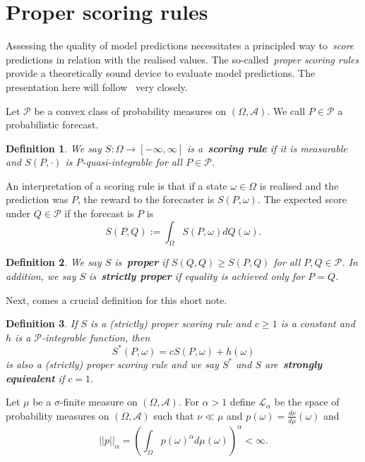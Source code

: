 \documentclass[a4paper, notitlepage, 11pt]{article}
\newtheorem{definition}{Definition}[]
\begin{document}
\section{Proper scoring rules}

Assessing the quality of model predictions necessitates a principled way to~\textit{score}  predictions in relation with the realised values.
The so-called~\textit{proper scoring rules} provide a theoretically sound device to evaluate model predictions.
The presentation here will follow~\cite{Gneiting2007} very closely.

Let $\mathcal{P}$ be a convex class of probability measures on $(\Omega, \mathcal{A})$.
We call $P \in \mathcal{P}$ a probabilistic forecast. 
\begin{definition}
 We say $S : \Omega \to [-\infty, \infty]$ is a~\textbf{scoring rule} if it is measurable and $S(P, \cdot)$ is $P$-quasi-integrable for all $P \in \mathcal{P}$.
\end{definition}
An interpretation of a scoring rule is that if a state $\omega \in \Omega$ is realised and the prediction was $P$, the reward to the forecaster is $S(P, \omega)$.
The expected score under $Q \in \mathcal{P}$ if the forecast is $P$ is
\begin{equation}
 \nonumber
 S(P, Q) := \int_{\Omega} S(P, \omega)dQ(\omega). 
\end{equation}

\begin{definition}
We say $S$ is~\textbf{proper} if $S(Q, Q) \geq S(P, Q)$ for all $P, Q \in \mathcal{P}$.
In addition, we say $S$ is~\textbf{strictly proper} if equality is achieved only for $P = Q$.
\end{definition}

Next, comes a crucial definition for this short note.
\begin{definition}
 If $S$ is a (strictly) proper scoring rule and $c\geq1$ is a constant and $h$ is a $\mathcal{P}$-integrable function, then~\citep[Eq. 2]{Gneiting2007}
 \begin{equation}
  \label{eq:strongly_equiv}
  S^\ast(P, \omega) = c S(P, \omega) + h(\omega)
 \end{equation}
is also a (strictly) proper scoring rule and we say $S^\ast$ and $S$ are~\textbf{strongly equivalent} if $c = 1$.
\end{definition}

Let $\mu$ be a $\sigma$-finite measure on $(\Omega, \mathcal{A})$. 
For $\alpha > 1$ define $\mathcal{L}_\alpha$ be the space of probability measures on $(\Omega, \mathcal{A})$ such that $\nu \ll \mu$ and $p(\omega) = \frac{d \nu}{d \mu}(\omega)$ and 
\begin{equation}
\nonumber
 ||p||_\alpha = \left( \int_{\Omega} p(\omega)^\alpha d\mu(\omega) \right)^\alpha < \infty.
\end{equation}
\end{document}
